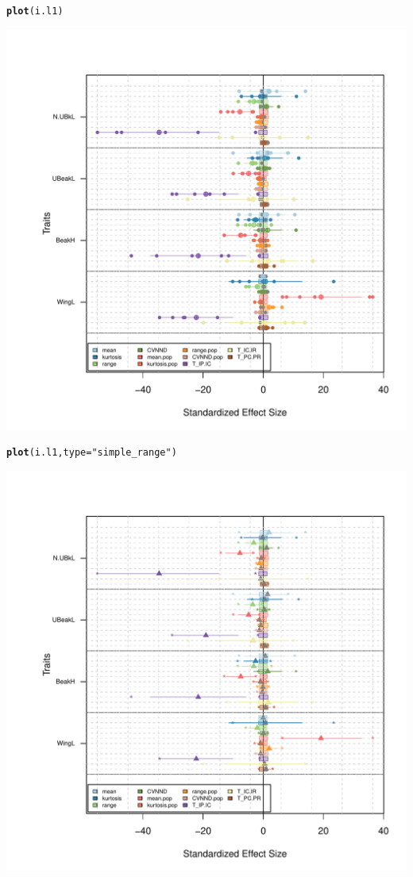 \documentclass[12pt]{article}\usepackage[]{graphicx}\usepackage[]{color}
\makeatletter
\def\maxwidth{ %
  \ifdim\Gin@nat@width>\linewidth
    \linewidth
  \else
    \Gin@nat@width
  \fi
}
\newcommand{\hlstr}[1]{\textcolor[rgb]{0.192,0.494,0.8}{#1}}%
\newcommand{\hlstd}[1]{\textcolor[rgb]{0.345,0.345,0.345}{#1}}%
\newcommand{\hlkwc}[1]{\textcolor[rgb]{0.333,0.667,0.333}{#1}}%
\newcommand{\hlkwd}[1]{\textcolor[rgb]{0.737,0.353,0.396}{\textbf{#1}}}%
\newenvironment{kframe}{%
 \def\at@end@of@kframe{}%
 \ifinner\ifhmode%
  \def\at@end@of@kframe{\end{minipage}}%
  \begin{minipage}{\columnwidth}%
 \fi\fi%
 \def\FrameCommand##1{\hskip\@totalleftmargin \hskip-\fboxsep
 \colorbox{shadecolor}{##1}\hskip-\fboxsep
     \hskip-\linewidth \hskip-\@totalleftmargin \hskip\columnwidth}%
 \MakeFramed {\advance\hsize-\width
   \@totalleftmargin\z@ \linewidth\hsize
   \@setminipage}}%
 {\par\unskip\endMakeFramed%
 \at@end@of@kframe}
\newenvironment{knitrout}{}{} %
\makeatother
\begin{document}
\begin{knitrout}
\color{fgcolor}\begin{kframe}
\begin{alltt}
\hlkwd{plot}\hlstd{(i.l1)}
\end{alltt}
\end{kframe}
\includegraphics[width=\maxwidth]{figure/unnamed-chunk-511} 
\begin{kframe}\begin{alltt}
\hlkwd{plot}\hlstd{(i.l1,}\hlkwc{type} \hlstd{=} \hlstr{"simple_range"}\hlstd{)}
\end{alltt}
\end{kframe}
\includegraphics[width=\maxwidth]{figure/unnamed-chunk-512} 

\end{knitrout}
\end{document}
